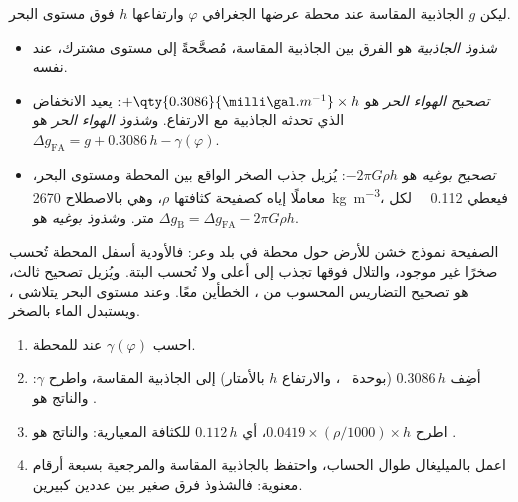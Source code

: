 \begin{definition}\label{def:b1:isostasy-gravity:anomalies}
ليكن $g$ الجاذبية المقاسة عند محطة عرضها الجغرافي $\varphi$ وارتفاعها $h$ فوق مستوى البحر.
\begin{itemize}
  \item \emph{شذوذ الجاذبية} هو الفرق بين الجاذبية المقاسة، مُصحَّحةً إلى مستوى مشترك،  عند  نفسه.
  \item \emph{تصحيح الهواء الحر} هو $+\qty{0.3086}{\milli\gal.m^{-1}}\times h$: يعيد الانخفاض الذي تحدثه الجاذبية مع الارتفاع. و\emph{شذوذ الهواء الحر} هو $\Delta g_{\mathrm{FA}} = g + 0.3086\,h - \gamma(\varphi)$.
  \item \emph{تصحيح بوغيه} هو $-2\pi G\rho h$: يُزيل جذب الصخر الواقع بين المحطة ومستوى البحر، معاملًا إياه كصفيحة كثافتها $\rho$، وهي بالاصطلاح \qty{2670}{kg.m^{-3}}، فيعطي \qty{0.112}{\milli\gal} لكل متر. و\emph{شذوذ بوغيه} هو $\Delta g_{\mathrm B} = \Delta g_{\mathrm{FA}} - 2\pi G\rho h$.
\end{itemize}
\end{definition}

الصفيحة نموذج خشن للأرض حول محطة في بلد وعر: فالأودية أسفل المحطة تُحسب صخرًا غير موجود، والتلال فوقها تجذب إلى أعلى ولا تُحسب البتة. ويُزيل تصحيح ثالث، هو تصحيح التضاريس المحسوب من ، الخطأين معًا. وعند مستوى البحر يتلاشى ، ويستبدل  الماء بالصخر.

\begin{method}\label{met:b1:isostasy-gravity:reduction}
\begin{enumerate}
  \item احسب  $\gamma(\varphi)$ عند  للمحطة.
  \item أضِف  $0.3086\,h$ (بوحدة \unit{\milli\gal}، والارتفاع $h$ بالأمتار) إلى الجاذبية المقاسة، واطرح $\gamma$: والناتج هو .
  \item اطرح  $0.0419\times(\rho/1000)\times h$، أي $0.112\,h$ للكثافة المعيارية: والناتج هو .
  \item اعمل بالميليغال طوال الحساب، واحتفظ بالجاذبية المقاسة والمرجعية بسبعة أرقام معنوية: فالشذوذ فرق صغير بين عددين كبيرين.
\end{enumerate}
\end{method}

